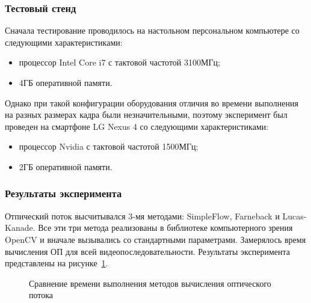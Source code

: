 \subsubsection{Тестовый стенд}
Сначала тестирование проводилось на настольном персональном компьютере со следующими характеристиками:

\begin{itemize}
\item процессор Intel Core i7 с тактовой частотой 3100МГц; 
\item 4ГБ оперативной памяти.
\end{itemize}

Однако при такой конфигурации оборудования отличия во времени выполнения на разных размерах кадра были незначительными, поэтому эксперимент был проведен на смартфоне LG Nexus 4 со следующими характеристиками:
\begin{itemize}
\item процессор Nvidia с тактовой частотой 1500МГц;
\item 2ГБ оперативной памяти.
\end{itemize}

\subsubsection{Результаты эксперимента}
Отпический поток высчитывался 3-мя методами: SimpleFlow, Farneback и Lucas-Kanade. Все эти три метода реализованы в библиотеке компьютерного зрения OpenCV и вначале вызывались со стандартными параметрами. Замерялось время вычисления ОП для всей видеопоследовательности. Результаты эксперимента представлены на рисунке~\ref{pic:compareMethods}.

\begin{figure}[!htb]
\caption{Сравнение времени выполнения методов вычисления оптического потока}
\label{pic:compareMethods}
\end{figure}

